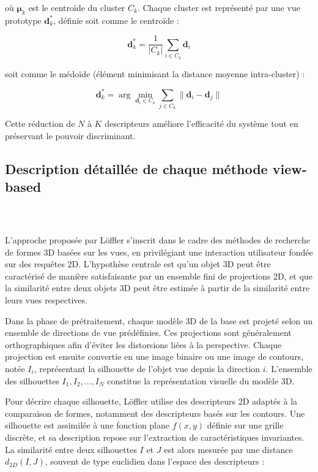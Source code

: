 \documentclass[11pt,a4paper,oneside]{report}
\begin{document}
où $\boldsymbol{\mu}_k$ est le centroïde du cluster $C_k$. Chaque cluster est représenté par une vue prototype $\mathbf{d}_k^*$, définie soit comme le centroïde :

$$\mathbf{d}_k^* = \frac{1}{|C_k|} \sum_{i \in C_k} \mathbf{d}_i$$

soit comme le médoïde (élément minimisant la distance moyenne intra-cluster) :

$$\mathbf{d}_k^* = \arg\min_{\mathbf{d}_i \in C_k} \sum_{j \in C_k} \|\mathbf{d}_i - \mathbf{d}_j\|$$

Cette réduction de $N$ à $K$ descripteurs améliore l'efficacité du système tout en préservant le pouvoir discriminant.

\subsection{Description détaillée de chaque méthode view-based}

\subsubsection{~\cite{loffler74}}

L’approche proposée par Löffler s’inscrit dans le cadre des méthodes de recherche de formes 3D basées sur les vues, en privilégiant une interaction utilisateur fondée sur des requêtes 2D. L’hypothèse centrale est qu’un objet 3D peut être caractérisé de manière satisfaisante par un ensemble fini de projections 2D, et que la similarité entre deux objets 3D peut être estimée à partir de la similarité entre leurs vues respectives.

Dans la phase de prétraitement, chaque modèle 3D de la base est projeté selon un ensemble de directions de vue prédéfinies. Ces projections sont généralement orthographiques afin d’éviter les distorsions liées à la perspective. Chaque projection est ensuite convertie en une image binaire ou une image de contours, notée $I_i$, représentant la silhouette de l’objet vue depuis la direction $i$. L’ensemble des silhouettes ${I_1, I_2, \dots, I_N}$ constitue la représentation visuelle du modèle 3D.

Pour décrire chaque silhouette, Löffler utilise des descripteurs 2D adaptés à la comparaison de formes, notamment des descripteurs basés sur les contours. Une silhouette est assimilée à une fonction plane $f(x,y)$ définie sur une grille discrète, et sa description repose sur l’extraction de caractéristiques invariantes. La similarité entre deux silhouettes $I$ et $J$ est alors mesurée par une distance $d_{2D}(I,J)$, souvent de type euclidien dans l’espace des descripteurs :
\end{document}
